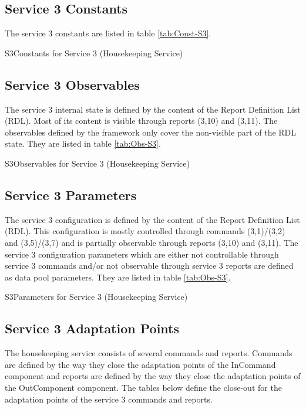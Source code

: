 \documentclass[a4paper,10pt]{article}
\newenvironment{cr_obs}[2]
{
\begin{longtable}{|l|p{9.5cm}|}
\caption{#2}\label{tab:Obs-#1} \\
\hline
\rowcolor{light-gray}
\textbf{Name} & \textbf{Description}\\
\hline\hline
\endfirsthead
\rowcolor{light-gray}
\textbf{Name} & \textbf{Description}\\
\hline\hline
\endhead
\DTLforeach*[\DTLiseq{\cat}{#1}]{dbObs}{\cat=Category,\name=Name,\desc=Desc}
{\DTLiffirstrow{}{\\\hline}\texttt{\name} & \desc}\\\hline
}
{\end{longtable}}
\newenvironment{cr_const}[2]
{
\begin{longtable}{|l|p{9.5cm}|}
\caption{#2}\label{tab:Const-#1} \\
\hline
\rowcolor{light-gray}
\textbf{Name} & \textbf{Description}\\
\hline\hline
\endfirsthead
\rowcolor{light-gray}
\textbf{Name} & \textbf{Description}\\
\hline\hline
\endhead
\DTLforeach*[\DTLiseq{\cat}{#1}]{dbConst}{\cat=Category,\name=Name,\desc=Desc}
{\DTLiffirstrow{}{\\\hline}\texttt{\name} & \desc}\\\hline
}
{\end{longtable}}
\newenvironment{cr_par}[2]
{
\begin{longtable}{|l|p{9.5cm}|}
\caption{#2}\label{tab:Par-#1} \\
\hline
\rowcolor{light-gray}
\textbf{Name} & \textbf{Description}\\
\hline\hline
\endfirsthead
\rowcolor{light-gray}
\textbf{Name} & \textbf{Description}\\
\hline\hline
\endhead
\DTLforeach*[\DTLiseq{\cat}{#1}]{dbPar}{\cat=Category,\name=Name,\desc=Desc}
{\DTLiffirstrow{}{\\\hline}\texttt{\name} & \desc}\\\hline
}
{\end{longtable}}
\begin{document}
 
\subsection{Service 3 Constants}\label{sec:serv3Const}
The service 3 constants are listed in table \ref{tab:Const-S3}.

\begin{cr_const}{S3}{Constants for Service 3 (Housekeeping Service)}
\end{cr_const}


\subsection{Service 3 Observables}\label{sec:serv3Obs}
The service 3 internal state is defined by the content of the Report Definition List (RDL). Most of its content is visible through reports (3,10) and (3,11). The observables defined by the framework only cover the non-visible part of the RDL state. They are listed in table \ref{tab:Obs-S3}.

\begin{cr_obs}{S3}{Observables for Service 3 (Housekeeping Service)}
\end{cr_obs}

\subsection{Service 3 Parameters}\label{sec:serv3Par}
The service 3 configuration is defined by the content of the Report Definition List (RDL). This configuration is mostly controlled through commands (3,1)/(3,2) and (3,5)/(3,7) and is partially observable through reports (3,10) and (3,11). The service 3 configuration parameters which are either not controllable through service 3 commands and/or not observable through service 3 reports are defined as data pool parameters. They are listed in table \ref{tab:Obs-S3}.

\begin{cr_par}{S3}{Parameters for Service 3 (Housekeeping Service)}
\end{cr_par}

\subsection{Service 3 Adaptation Points}\label{sec:serv3AP}
The housekeeping service consists of several commands and reports. Commands are defined by the way they close the adaptation points of the InCommand component and reports are defined by the way they close the adaptation points of the OutComponent component. The tables below define the close-out for the adaptation points of the service 3 commands and reports.
\end{document}
